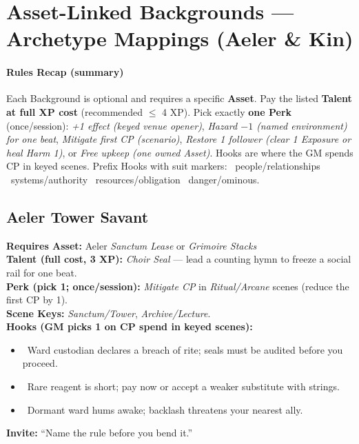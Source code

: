 \documentclass[11pt]{article}
\begin{document}
\section*{Asset-Linked Backgrounds — Archetype Mappings (Aeler \& Kin)}

\paragraph{Rules Recap (summary)}
Each Background is optional and requires a specific \textbf{Asset}. Pay the listed \textbf{Talent at full XP cost} (recommended $\leq$ 4 XP). Pick exactly \textbf{one Perk} (once/session): \emph{+1 effect (keyed venue opener)}, \emph{Hazard $-1$ (named environment) for one beat}, \emph{Mitigate first CP (scenario)}, \emph{Restore 1 follower (clear 1 Exposure or heal Harm 1)}, or \emph{Free upkeep (one owned Asset)}. Hooks are where the GM spends CP in keyed scenes. Prefix Hooks with suit markers: \heartsuit~people/relationships \quad \clubsuit~systems/authority \quad \diamondsuit~resources/obligation \quad \spadesuit~danger/ominous.

\subsection*{Aeler Tower Savant}
\textbf{Requires Asset:} Aeler \emph{Sanctum Lease} or \emph{Grimoire Stacks}\\
\textbf{Talent (full cost, 3 XP):} \emph{Choir Seal} — lead a counting hymn to freeze a social rail for one beat.\\
\textbf{Perk (pick 1; once/session):} \emph{Mitigate CP} in \emph{Ritual/Arcane} scenes (reduce the first CP by 1).\\
\textbf{Scene Keys:} \emph{Sanctum/Tower}, \emph{Archive/Lecture}.\\[2pt]
\textbf{Hooks (GM picks 1 on CP spend in keyed scenes):}
\begin{itemize}
  \item \clubsuit~Ward custodian declares a breach of rite; seals must be audited before you proceed.
  \item \diamondsuit~Rare reagent is short; pay now or accept a weaker substitute with strings.
  \item \spadesuit~Dormant ward hums awake; backlash threatens your nearest ally.
\end{itemize}
\textbf{Invite:} “Name the rule before you bend it.”
\end{document}
